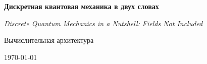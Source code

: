 \begin{titlepage}
  \centering
  \vspace*{2cm}
  {\LARGE\bfseries Дискретная квантовая механика в двух словах\par}
  \vspace{0.35cm}
  {\normalsize\itshape Discrete Quantum Mechanics in a Nutshell: Fields Not Included\par}
  \vspace{0.8cm}
  {\Large Вычислительная архитектура\par}
  \vfill
  {\large \today\par}
\end{titlepage}
\clearpage

\clearpage
\tableofcontents
\clearpage
